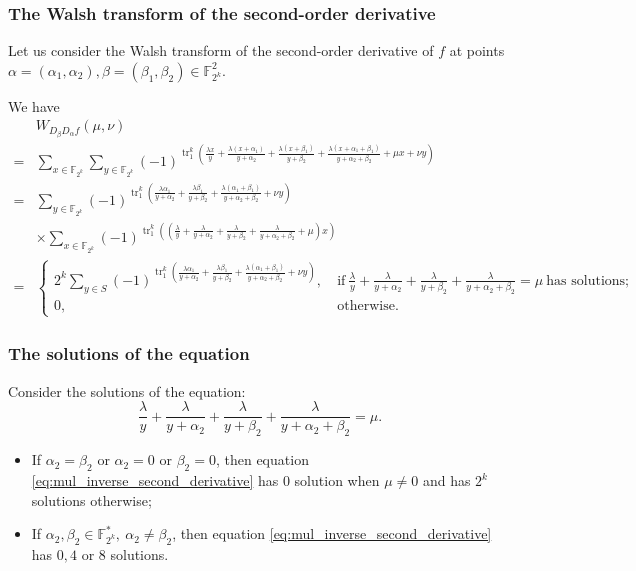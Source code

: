 \documentclass[
    aspectratio=169,                   %
]{beamer}
\newcommand{\F}{\mathbb{F}}
\newcommand{\Fks}{\mathbb{F}_{2^k}^*}
\newcommand{\Fk}{\mathbb{F}_{2^k}}
\newcommand{\tr}{\operatorname{tr}_1^k}
\begin{document}
    \begin{frame}
        \frametitle{The Walsh transform of the second-order derivative}
    
        Let us consider the Walsh transform of the second-order derivative of $ f $ 
        at points $ \alpha=(\alpha_1,\alpha_2),\beta=(\beta_1,\beta_2)\in\Fk^2 $. 

        We have 
        \begin{align*}
            &W_{D_{\beta}D_{\alpha}f}(\mu,\nu)\\
            =&\sum_{x\in\F_{2^k}}\sum_{y\in\F_{2^k}}(-1)^{\tr\left(\frac{\lambda x}{y}+\frac{\lambda (x+\alpha_1)}{y+\alpha_2}+\frac{\lambda (x+\beta_1)}{y+\beta_2}+\frac{\lambda (x+\alpha_1+\beta_1)}{y+\alpha_2+\beta_2}+\mu x+\nu y\right)}\nonumber\\
        =&\sum_{y\in\F_{2^k}}(-1)^{\tr\left(\frac{\lambda\alpha_1}{y+\alpha_2}+\frac{\lambda\beta_1}{y+\beta_2}+\frac{\lambda(\alpha_1+\beta_1)}{y+\alpha_2+\beta_2}+\nu y\right)}\nonumber\\
        &\times \sum_{x\in\F_{2^k}}(-1)^{\tr\left(\left(\frac{\lambda}{y}+\frac{\lambda}{y+\alpha_2}+\frac{\lambda}{y+\beta_2}+\frac{\lambda}{y+\alpha_2+\beta_2}+\mu\right)x\right)}\nonumber\\
            =&\begin{cases}
                2^k\sum_{y\in S}(-1)^{\tr\left(\frac{\lambda\alpha_1}{y+\alpha_2}+\frac{\lambda\beta_1}{y+\beta_2}+\frac{\lambda(\alpha_1+\beta_1)}{y+\alpha_2+\beta_2}+\nu y\right)},&~\text{if}~\frac{\lambda}{y}+\frac{\lambda}{y+\alpha_2}+\frac{\lambda}{y+\beta_2}+\frac{\lambda}{y+\alpha_2+\beta_2}=\mu~\text{has solutions};\\
            0, &~\text{otherwise}.
            \end{cases}
        \end{align*}
    \end{frame}


    \begin{frame}
        \frametitle{The solutions of the equation}
        Consider the solutions of the equation: 
        \begin{equation}\label{eq:mul_inverse_second_derivative}
            \frac{\lambda}{y}+\frac{\lambda}{y+\alpha_2}+\frac{\lambda}{y+\beta_2}+\frac{\lambda}{y+\alpha_2+\beta_2}=\mu.
        \end{equation}
        \begin{itemize}
            \item If $ \alpha_2=\beta_2 $ or $ \alpha_2=0 $ or $ \beta_2=0 $, 
            then equation \eqref{eq:mul_inverse_second_derivative} has $ 0 $ solution when
            $ \mu\ne 0 $ and has $ 2^k $ solutions otherwise;
            \item If $ \alpha_2,\beta_2\in\Fks,~\alpha_2\ne\beta_2 $, 
            then equation \eqref{eq:mul_inverse_second_derivative} has $ 0,4 $ or $ 8 $ solutions.
        \end{itemize}
    \end{frame}
\end{document}
